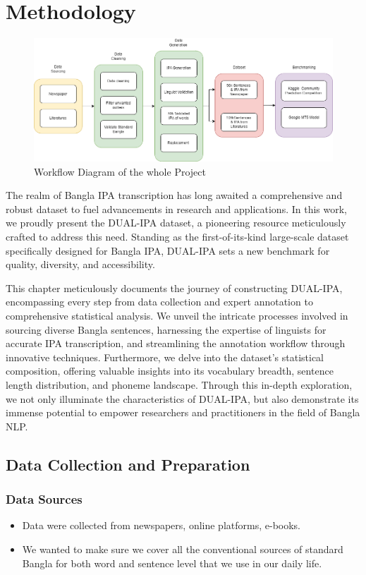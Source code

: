 \chapter{Methodology}

 \begin{figure}[htbp]
    \centering
    \includegraphics[width=\textwidth]{Images/Diagram/methodology.png}
    \caption{Workflow Diagram of the whole Project}
    \label{fig:wrokflow}
\end{figure} 


The realm of Bangla IPA transcription has long awaited a comprehensive and robust dataset to fuel advancements in research and applications. In this work, we proudly present the DUAL-IPA dataset, a pioneering resource meticulously crafted to address this need. Standing as the first-of-its-kind large-scale dataset specifically designed for Bangla IPA, DUAL-IPA sets a new benchmark for quality, diversity, and accessibility.

This chapter meticulously documents the journey of constructing DUAL-IPA, encompassing every step from data collection and expert annotation to comprehensive statistical analysis. We unveil the intricate processes involved in sourcing diverse Bangla sentences, harnessing the expertise of linguists for accurate IPA transcription, and streamlining the annotation workflow through innovative techniques. Furthermore, we delve into the dataset's statistical composition, offering valuable insights into its vocabulary breadth, sentence length distribution, and phoneme landscape. Through this in-depth exploration, we not only illuminate the characteristics of DUAL-IPA, but also demonstrate its immense potential to empower researchers and practitioners in the field of Bangla NLP. 

\section{Data Collection and Preparation}
\subsection{Data Sources}
\begin{itemize}
    \item Data were collected from newspapers, online platforms, e-books.
    \item We wanted to make sure we cover all the conventional sources of standard Bangla for both word and sentence level that we use in our daily life.
\end{itemize}
